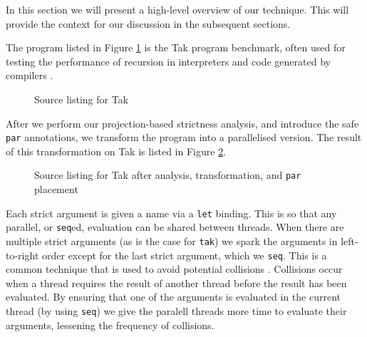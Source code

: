 In this section we will present a high-level overview of our technique.
This will provide the context for our discussion in the subsequent sections.

The program listed in Figure \ref{fig:tak} is the Tak program benchmark, often used
for testing the performance of recursion in interpreters and code generated by
compilers \citep{ExamplesOfRecursion}.

\begin{figure}
  
\caption{Source listing for Tak}
\label{fig:tak}
\end{figure}

After we perform our projection-based strictness analysis, and introduce the
safe \verb-par- annotations, we transform the program into a parallelised
version. The result of this transformation on Tak is listed in Figure
\ref{fig:takParred}.

\begin{figure}[!h]
  
\caption{Source listing for Tak after analysis, transformation, and \texttt{par} placement}
\label{fig:takParred}
\end{figure}

Each strict argument is given a name via a \verb-let- binding. This is so that
any parallel, or \verb-seq-ed, evaluation can be shared between threads. When
there are multiple strict arguments (as is the case for \verb-tak-) we spark
the arguments in left-to-right order except for the last strict argument, which
we \verb-seq-. This is a common technique that is used to avoid potential
collisions \citep{strategies}. Collisions occur when a thread requires the
result of another thread before the result has been evaluated. By ensuring that
one of the arguments is evaluated in the current thread (by using \texttt{seq})
we give the paralell threads more time to evaluate their arguments, lessening
the frequency of collisions.

%
%
%

